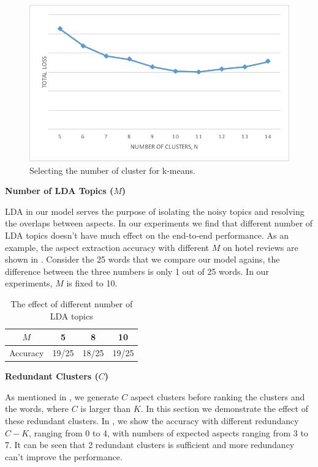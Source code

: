 \begin{figure}[t!]
\centering
\includegraphics[width=0.9\columnwidth]{figures/differentn}
\caption{Selecting the number of cluster for k-means.}
\label{fig:differentn}
\end{figure}

\textbf{Number of LDA Topics ($M$)}

LDA in our model serves the purpose of isolating the 
noisy topics and resolving the overlaps between aspects.
In our experiments we find that different number of LDA topics
doesn't have much effect on the end-to-end performance.
As an example, the aspect extraction accuracy with different $M$
on hotel reviews are shown in .
Consider the 25 words that we compare our model agains,
the difference between the three numbers is only 
1 out of 25 words.
In our experiments, $M$ is fixed to 10.

\begin{table}[th]
\centering
\caption{The effect of different number of LDA topics}
\label{table:differentm}
\begin{tabular}{|c|c|c|c|}
\hline
$M$ & 5 & 8 & 10 \\\hline
Accuracy & 19/25 & 18/25 & 19/25 \\\hline
\end{tabular}
\end{table}

\textbf{Redundant Clusters ($C$)}

As mentioned in , 
we generate $C$ aspect clusters before ranking the clusters and the words, where $C$ is larger than $K$.
In this section we demonstrate the effect of these redundant clusters.
In , we show the accuracy with different 
redundancy $C-K$, 
ranging from 0 to 4, with numbers of expected aspects ranging from 3 to 7.
It can be seen that 2 redundant clusters is sufficient and 
more redundancy can't improve the performance.

